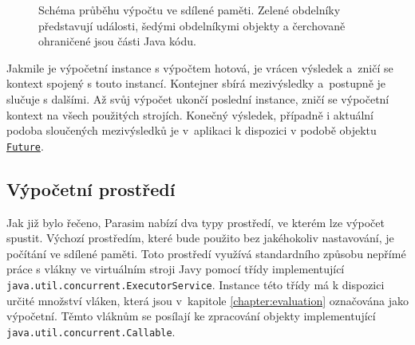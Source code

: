 \begin{figure}[H]
\begin{center}
{}
\end{center}
\caption{Schéma průběhu výpočtu ve sdílené paměti. Zelené obdelníky představují události,
šedými obdelníkymi objekty a čerchovaně ohraničené jsou části Java kódu.}
\end{figure}

Jakmile je výpočetní instance s výpočtem hotová, je vrácen výsledek a~zničí se
kontext spojený s touto instancí. Kontejner sbírá mezivýsledky a~postupně je slučuje
s dalšími. Až svůj výpočet ukončí poslední instance, zničí se výpočetní kontext na
všech použitých strojích. Konečný výsledek, případně i aktuální podoba sloučených
mezivýsledků je v~aplikaci k dispozici v podobě objektu \href{https://github.com/sybila/parasim/blob/2.0.0.Final/extensions/computation-lifecycle-api/src/main/java/org/sybila/parasim/computation/lifecycle/api/Future.java}{\texttt{Future}}.

\subsection{Výpočetní prostředí}

Jak již bylo řečeno, Parasim nabízí dva typy prostředí, ve kterém lze výpočet spustit.
Výchozí prostředím, které bude použito bez jakéhokoliv na\-sta\-vo\-vá\-ní, je počítání ve sdílené paměti.
Toto prostředí využívá standardního způsobu nepřímé práce s vlákny ve virtuálním stroji Javy
pomocí třídy implementující \texttt{java.util.concurrent.ExecutorService}.
Instance té\-to třídy má k dispozici určité množství vláken, která jsou v~kapitole
\ref{chapter:evaluation} označována jako výpočetní. Těmto vláknům se posílají ke
zpracování objekty implementující \texttt{java.util.concurrent.Callable}.


